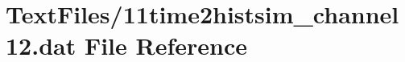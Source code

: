 \hypertarget{11time2histsim__channel12_8dat}{}\section{Text\+Files/11time2histsim\+\_\+channel12.dat File Reference}
\label{11time2histsim__channel12_8dat}
